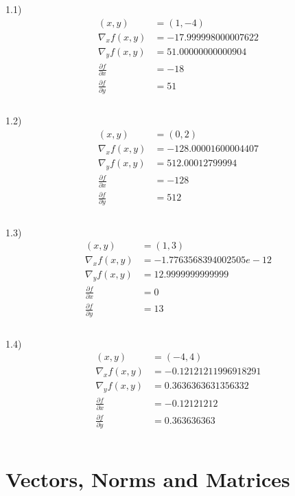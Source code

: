\documentclass[12pt]{article}         %
\begin{document}
1.1)\\
$$
\begin{aligned}
(x,y) &= (1, -4)\\
\nabla_x f(x,y) &= -17.999998000007622\\
\nabla_y f(x,y) &= 51.00000000000904\\
\frac {\partial f}{\partial x} &= -18\\
\frac {\partial f}{\partial y} &= 51\\\\
\end{aligned}
$$

1.2)\\
$$
\begin{aligned}
(x,y) &= (0, 2)\\
\nabla_x f(x,y) &= -128.00001600004407\\
\nabla_y f(x,y) &= 512.00012799994\\
\frac {\partial f}{\partial x} &= -128\\
\frac {\partial f}{\partial y} &= 512\\\\
\end{aligned}
$$

1.3) \\
$$
\begin{aligned}
(x,y) &= (1, 3)\\
\nabla_x f(x,y) &= -1.7763568394002505e-12\\
\nabla_y f(x,y) &= 12.9999999999999\\
\frac {\partial f}{\partial x} &= 0\\
\frac {\partial f}{\partial y} &= 13\\\\
\end{aligned}
$$

1.4)\\
$$
\begin{aligned}
(x,y) &= (-4, 4)\\
\nabla_x f(x,y) &= -0.12121211996918291\\
\nabla_y f(x,y) &= 0.3636363631356332\\
\frac {\partial f}{\partial x} &= -0.12121212\\
\frac {\partial f}{\partial y} &= 0.363636363\\\\
\end{aligned}
$$


\section{Vectors, Norms and Matrices}
\end{document}
